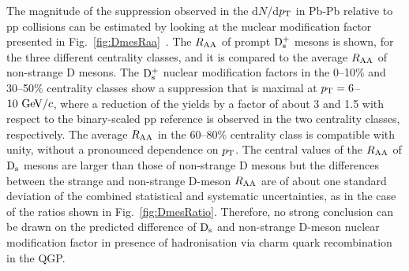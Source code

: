 The magnitude of the suppression observed in the d$N$/d$p_{\rm T}$ in Pb-Pb relative to pp collisions 
can be estimated by looking at the nuclear modification factor presented in Fig.~\ref{fig:DmesRaa}~\cite{ALICE-PUBLIC-2017-003}.
The $R_{\rm AA}$ of prompt ${\rm D_s^+}$ mesons is shown, for the three different centrality classes,
and it is compared to the average $R_{\rm AA}$ of non-strange 
D mesons. The ${\rm D_s^+}$ nuclear modification factors in the 0--10\% 
and 30--50\% centrality classes show a suppression that is
maximal at $p_{\rm T}=6$--$10~\mathrm{GeV}/c$, where a reduction of the yields by
a factor of about 3 and 1.5 with respect to the binary-scaled
 pp reference is observed in the two centrality classes, respectively.
The average $R_{\rm AA}$ in the 60--80\% centrality class is compatible 
with unity, without a pronounced dependence on $p_{\rm T}$.
 The central values of the $R_{\rm AA}$ of ${\rm D_s}$ mesons are larger than those of non-strange D mesons but the 
differences between the strange and non-strange D-meson $R_{\rm AA}$ are 
of about one standard deviation of the combined statistical and systematic
uncertainties, as in the case of the ratios shown in Fig.~\ref{fig:DmesRatio}.
Therefore, no strong conclusion can be drawn on the predicted difference of ${\rm D_s}$ and 
non-strange D-meson nuclear modification factor in presence of hadronisation
via charm quark recombination in the QGP.\\




